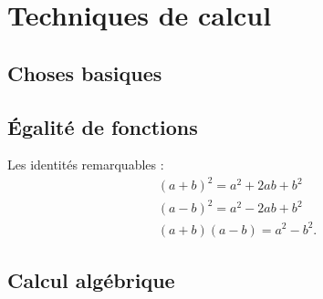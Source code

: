 

\section{Techniques de calcul}

\subsection{Choses basiques}


\subsection{Égalité de fonctions}

Les identités remarquables :
\begin{subequations}
    \begin{align}
        (a+b)^2=a^2+2ab+b^2\\
        (a-b)^2=a^2-2ab+b^2\\
        (a+b)(a-b)=a^2-b^2.
    \end{align}
\end{subequations}


\subsection{Calcul algébrique}

